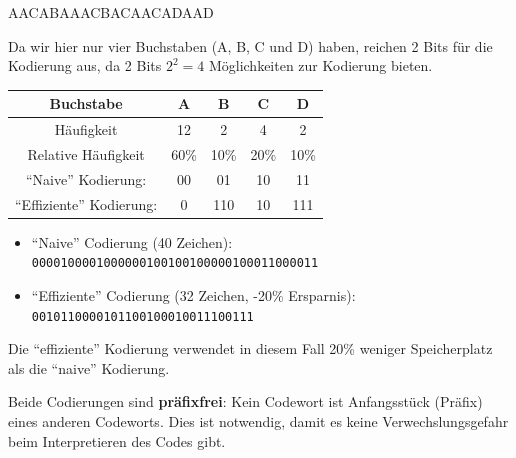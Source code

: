 \begin{center}
AACABAAACBACAACADAAD
\end{center}

Da wir hier nur vier Buchstaben (A, B, C und D) haben, reichen 2 Bits für die Kodierung aus, da 2 Bits $2^2=4$ Möglichkeiten zur Kodierung bieten.

\begin{table}[H]
\centering
	\begin{tabular}{c|c|c|c|c}
		\textbf{Buchstabe} & \textbf{A} & \textbf{B} & \textbf{C} & \textbf{D} \\\midrule\midrule
		Häufigkeit & 12 &  2 & 4 & 2 \\\hline
		Relative Häufigkeit & 60\% & 10\% & 20\% & 10\% \\\hline
		``Naive'' Kodierung: & 00 & 01 & 10 & 11 \\\hline
		``Effiziente'' Kodierung: & 0 & 110  & 10&  111\\
	\end{tabular}
\end{table}
\begin{itemize}
	\item ``Naive'' Codierung (40 Zeichen):\\ \texttt{0000100001000000100100100000100011000011} 
	\item ``Effiziente'' Codierung (32 Zeichen, -20\% Ersparnis):\\ \texttt{0010110000101100100010011100111}\\

\end{itemize}

Die ``effiziente'' Kodierung verwendet in diesem Fall 20\% weniger Speicherplatz als die ``naive'' Kodierung.

Beide Codierungen sind \textbf{präfixfrei}: Kein Codewort ist Anfangsstück (Präfix) eines anderen Codeworts. Dies ist notwendig, damit es keine Verwechslungsgefahr beim Interpretieren des Codes gibt.

